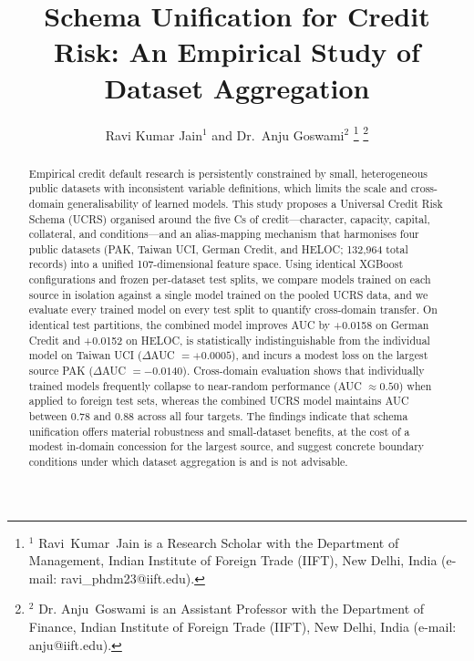 \documentclass[onecolumn]{IEEEtai}
\begin{document}
\title{Schema Unification for Credit Risk: An Empirical Study of Dataset Aggregation}


\author{Ravi Kumar Jain$^{1}$ and Dr.~Anju Goswami$^{2}$
\thanks{$^{1}$ Ravi~Kumar~Jain is a Research Scholar with the Department of Management, Indian Institute of Foreign Trade (IIFT), New Delhi, India (e-mail: ravi\_phdm23@iift.edu).}
\thanks{$^{2}$ Dr. Anju~Goswami is an Assistant Professor with the Department of Finance, Indian Institute of Foreign Trade (IIFT), New Delhi, India (e-mail: anju@iift.edu).}}


\maketitle

\begin{abstract}
Empirical credit default research is persistently constrained by small, heterogeneous public datasets with inconsistent variable definitions, which limits the scale and cross-domain generalisability of learned models. This study proposes a Universal Credit Risk Schema (UCRS) organised around the five Cs of credit---character, capacity, capital, collateral, and conditions---and an alias-mapping mechanism that harmonises four public datasets (PAK, Taiwan UCI, German Credit, and HELOC; 132{,}964 total records) into a unified 107-dimensional feature space. Using identical XGBoost configurations and frozen per-dataset test splits, we compare models trained on each source in isolation against a single model trained on the pooled UCRS data, and we evaluate every trained model on every test split to quantify cross-domain transfer. On identical test partitions, the combined model improves AUC by +0.0158 on German Credit and +0.0152 on HELOC, is statistically indistinguishable from the individual model on Taiwan UCI ($\Delta$AUC $= +0.0005$), and incurs a modest loss on the largest source PAK ($\Delta$AUC $= -0.0140$). Cross-domain evaluation shows that individually trained models frequently collapse to near-random performance (AUC $\approx 0.50$) when applied to foreign test sets, whereas the combined UCRS model maintains AUC between 0.78 and 0.88 across all four targets. The findings indicate that schema unification offers material robustness and small-dataset benefits, at the cost of a modest in-domain concession for the largest source, and suggest concrete boundary conditions under which dataset aggregation is and is not advisable.
\end{abstract}
\end{document}

